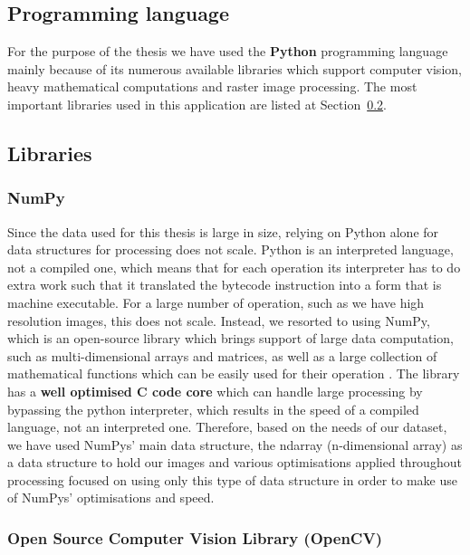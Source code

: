 \documentclass[12pt, a4paper]{report}
\begin{document}
	\subsection{Programming language}
	\label{seq:programminglang}
	
	\par For the purpose of the thesis we have used the \textbf{Python} programming language mainly because of its numerous available libraries which support computer vision, heavy mathematical computations and raster image processing. The most important libraries used in this application are listed at Section~\ref{seq:libraries}.
	
	\subsection{Libraries}
	\label{seq:libraries}
	
	\subsubsection{NumPy}
	
	\par Since the data used for this thesis is large in size, relying on Python alone for data structures for processing does not scale. Python is an interpreted language, not a compiled one, which means that for each operation its interpreter has to do extra work such that it translated the bytecode instruction into a form that is machine executable. For a large number of operation, such as we have high resolution images, this does not scale. Instead, we resorted to using NumPy, which is an open-source library which brings support of large data computation, such as multi-dimensional arrays and matrices, as well as a large collection of mathematical functions which can be easily used for their operation \cite{HARRIS2020}. The library has a \textbf{well optimised C code core} which can handle large processing by bypassing the python interpreter, which results in the speed of a compiled language, not an interpreted one. Therefore, based on the needs of our dataset, we have used NumPys' main data structure, the ndarray (n-dimensional array) as a data structure to hold our images and various optimisations applied throughout processing focused on using only this type of data structure in order to make use of NumPys' optimisations and speed.
	
	\subsubsection{Open Source Computer Vision Library (OpenCV)}
	
\end{document}

